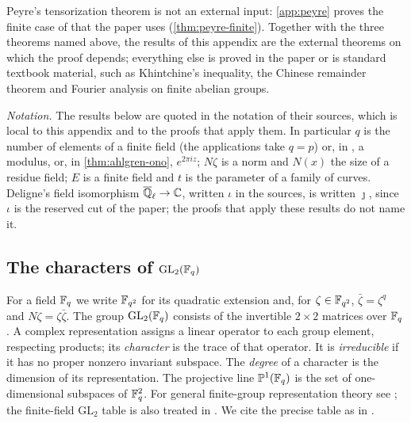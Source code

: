 Peyre's tensorization theorem is not an external input: \cref{app:peyre}
proves the finite case of \cite[Theorem~3.3.1]{Peyre} that the paper uses
(\cref{thm:peyre-finite}). Together with the three theorems named above, the
results of this appendix are the external theorems on which the proof
depends; everything else is proved in the paper or is standard textbook
material, such as Khintchine's inequality, the Chinese remainder theorem and
Fourier analysis on finite abelian groups.

\emph{Notation.} The results below are quoted in the notation of their
sources, which is local to this appendix and to the proofs that apply them.
In particular $q$ is the number of elements of a finite field (the
applications take $q=p$) or, in \cite{BMOR18}, a modulus, or, in
\cref{thm:ahlgren-ono}, $e^{2\pi iz}$; $N\zeta$ is a norm
and $N(x)$ the size of a residue field; $E$ is a finite field and $t$ is the
parameter of a family of curves.
Deligne's field isomorphism $\overline{\mathbb Q}_\ell\to\mathbb C$, written
$\iota$ in the sources, is written $\jmath$, since $\iota$ is the reserved cut
of the paper; the proofs that apply these results do not name it.

\subsection{The characters of \texorpdfstring{$\mathrm{GL}_2(\mathbb F_q)$}{GL2(Fq)}}
\label{subsec:external:gl2}

For a field $\mathbb F_q$ we write $\mathbb F_{q^2}$ for its quadratic extension and, for
$\zeta\in\mathbb F_{q^2}$, $\bar\zeta=\zeta^q$ and $N\zeta=\zeta\bar\zeta$.
The group $\mathrm{GL}_2(\mathbb F_q)$ consists of the invertible $2\times2$
matrices over $\mathbb F_q$. A complex representation assigns a linear operator to
each group element, respecting products; its \emph{character} is the trace
of that operator. It is \emph{irreducible} if it has no proper nonzero
invariant subspace. The \emph{degree} of a character is the dimension of its
representation. The projective line $\mathbb P^1(\mathbb F_q)$ is the set of
one-dimensional subspaces of $\mathbb F_q^2$. For general finite-group
representation theory see \cite{Serre77,Isaacs76}; the finite-field
$\mathrm{GL}_2$ table is also treated in \cite{PiatetskiShapiro83}. We cite
the precise table as in \cite[\S5.2]{FultonHarris}.


